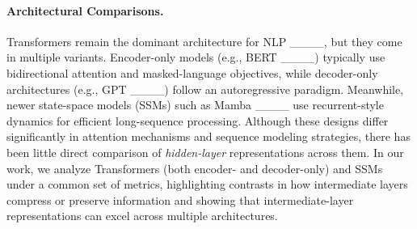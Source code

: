

\paragraph{Architectural Comparisons.}

Transformers remain the dominant architecture for NLP ____, but they come in multiple variants. Encoder-only models (e.g., BERT ____) typically use bidirectional attention and masked-language objectives, while decoder-only architectures (e.g., GPT ____) follow an autoregressive paradigm. Meanwhile, newer state-space models (SSMs) such as Mamba ____ use recurrent-style dynamics for efficient long-sequence processing. Although these designs differ significantly in attention mechanisms and sequence modeling strategies, there has been little direct comparison of \emph{hidden-layer} representations across them. In our work, we analyze Transformers (both encoder- and decoder-only) and SSMs under a common set of metrics, highlighting contrasts in how intermediate layers compress or preserve information and showing that intermediate-layer representations can excel across multiple architectures.






